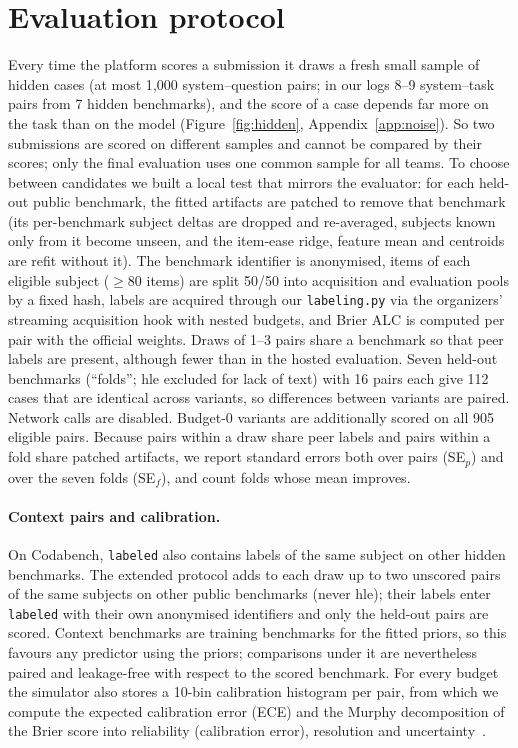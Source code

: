 \documentclass{article}
\begin{document}
\section{Evaluation protocol}
\label{sec:eval}

Every time the platform scores a submission it draws a fresh small sample of hidden cases (at most 1{,}000 system--question pairs; in our logs 8--9 system--task pairs from 7 hidden benchmarks), and the score of a case depends far more on the task than on the model (Figure~\ref{fig:hidden}, Appendix~\ref{app:noise}). So two submissions are scored on different samples and cannot be compared by their scores; only the final evaluation uses one common sample for all teams. To choose between candidates we built a local test that mirrors the evaluator: for each held-out public benchmark, the fitted artifacts are patched to remove that benchmark (its per-benchmark subject deltas are dropped and re-averaged, subjects known only from it become unseen, and the item-ease ridge, feature mean and centroids are refit without it). The benchmark identifier is anonymised, items of each eligible subject ($\ge 80$ items) are split 50/50 into acquisition and evaluation pools by a fixed hash, labels are acquired through our \texttt{labeling.py} via the organizers' streaming acquisition hook with nested budgets, and Brier ALC is computed per pair with the official weights. Draws of 1--3 pairs share a benchmark so that peer labels are present, although fewer than in the hosted evaluation. Seven held-out benchmarks (``folds''; hle excluded for lack of text) with 16 pairs each give 112 cases that are identical across variants, so differences between variants are paired. Network calls are disabled. Budget-0 variants are additionally scored on all 905 eligible pairs. Because pairs within a draw share peer labels and pairs within a fold share patched artifacts, we report standard errors both over pairs (SE$_p$) and over the seven folds (SE$_f$), and count folds whose mean improves.

\paragraph{Context pairs and calibration.} On Codabench, \texttt{labeled} also contains labels of the same subject on other hidden benchmarks. The extended protocol adds to each draw up to two unscored pairs of the same subjects on other public benchmarks (never hle); their labels enter \texttt{labeled} with their own anonymised identifiers and only the held-out pairs are scored. Context benchmarks are training benchmarks for the fitted priors, so this favours any predictor using the priors; comparisons under it are nevertheless paired and leakage-free with respect to the scored benchmark. For every budget the simulator also stores a 10-bin calibration histogram per pair, from which we compute the expected calibration error (ECE) and the Murphy decomposition of the Brier score into reliability (calibration error), resolution and uncertainty~\cite{murphy}.
\end{document}
